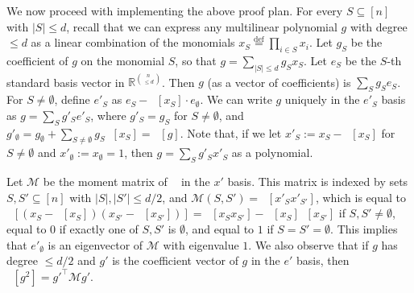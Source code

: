 \documentclass[10pt,a4paper]{article}
\theoremstyle{definition}
\newcommand{\defeq}{\stackrel{\mathrm{def}}=}
\newcommand{\R}{\mathbb R}
\DeclareMathOperator{\pE}{\tilde{\mathbb{E}}}
\def\defeq{\stackrel{\mathrm{def}}{=}}
\def\abs#1{\left|#1  \right|}
\newcommand{\M}{\mathcal{M}}
\begin{document}
We now proceed with implementing the above proof plan. For every $S \subseteq [n]$ with $\abs{S} \leq d$, recall that we can express any multilinear polynomial $g$ with degree $\leq d$ as a linear combination of the monomials $x_S \defeq \prod_{i \in S} x_i$. Let $g_S$ be the coefficient of $g$ on the monomial $S$, so that $g = \sum_{\abs{S} \leq d} g_S x_S$. Let $e_S$ be the $S$-th standard basis vector in $\R^{{n \choose \leq d}}$. Then $g$ (as a vector of coefficients) is $\sum_{S} g_S e_S$. For $S \ne \emptyset$, define $e'_S$ as $e_S - \pE[x_S] \cdot e_{\emptyset}$. We can write $g$ uniquely in the $e'_S$ basis as $g = \sum_{S} g'_S e'_S$, where $g'_S = g_S$ for $S \ne \emptyset$, and $g'_{\emptyset} = g_{\emptyset} + \sum_{S \ne \emptyset} g_S \pE[x_S] = \pE[g]$.
Note that, if we let $x'_S := x_S - \pE[x_S]$ for $S \ne \emptyset$ and $x'_{\emptyset} := x_{\emptyset} = 1$, then $g = \sum_{S} g'_S x'_S$ as a polynomial.

Let $\M$ be the moment matrix of $\pE$ in the $x'$ basis. This matrix is indexed by sets $S, S' \subseteq [n]$ with $\abs{S}, \abs{S'} \leq d/2$, and $\M(S,S') = \pE[x'_S x'_{S'}]$, which is equal to $\pE[(x_S - \pE[x_S])(x_{S'} - \pE[x_{S'}])] = \pE[x_S x_{S'}] - \pE[x_S]\pE[x_{S'}]$ if $S,S' \ne \emptyset$, equal to $0$ if exactly one of $S,S'$ is $\emptyset$, and equal to $1$ if $S = S' = \emptyset$. This implies that $e'_{\emptyset}$ is an eigenvector of $\M$ with eigenvalue $1$. We also observe that if $g$ has degree $\leq d/2$ and $g'$ is the coefficient vector of $g$ in the $e'$ basis, then $\pE[g^2] = g'^{\top} \M g'$.
\end{document}
